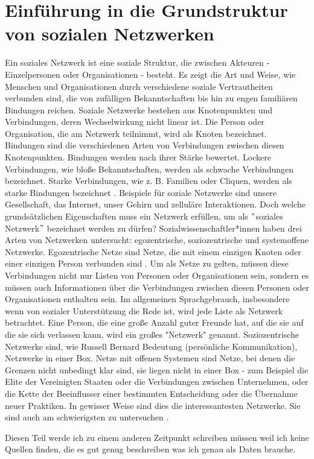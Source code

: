 \section{Einführung in die Grundstruktur von sozialen Netzwerken}
Ein soziales Netzwerk ist eine soziale Struktur, die zwischen Akteuren - Einzelpersonen oder Organisationen - besteht. Es zeigt die Art und Weise, wie Menschen und Organisationen durch verschiedene soziale Vertrautheiten verbunden sind, die von zufälligen Bekanntschaften bis hin zu engen familiären Bindungen reichen. Soziale Netzwerke bestehen aus Knotenpunkten und Verbindungen, deren Wechselwirkung nicht linear ist. Die Person oder Organisation, die am Netzwerk teilnimmt, wird als Knoten bezeichnet. Bindungen sind die verschiedenen Arten von Verbindungen zwischen diesen Knotenpunkten. Bindungen werden nach ihrer Stärke bewertet. Lockere Verbindungen, wie bloße Bekanntschaften, werden als schwache Verbindungen bezeichnet. Starke Verbindungen, wie z. B. Familien oder Cliquen, werden als starke Bindungen bezeichnet \cite{SNADefinition}. Beispiele für soziale Netzwerke sind unsere Gesellschaft, das Internet, unser Gehirn und zelluläre Interaktionen.
Doch welche grundsätzlichen Eigenschaften muss ein Netzwerk erfüllen, um als $"$soziales Netzwerk$"$ bezeichnet werden zu dürfen? 
Sozialwissenschaftler*innen haben drei Arten von Netzwerken untersucht: egozentrische, soziozentrische und systemoffene
Netzwerke. Egozentrische Netze sind Netze, die mit einem einzigen Knoten oder einer einzigen Person verbunden sind \cite{egocentric}. Um als Netze zu gelten, müssen diese Verbindungen nicht nur Listen von Personen oder Organisationen sein, sondern es müssen auch Informationen über die Verbindungen zwischen diesen Personen oder Organisationen enthalten sein. Im allgemeinen Sprachgebrauch, insbesondere wenn von sozialer Unterstützung die Rede ist, wird jede Liste als Netzwerk betrachtet. Eine Person, die eine große Anzahl guter Freunde hat, auf die sie auf die sie sich verlassen kann, wird ein großes "Netzwerk" genannt. Soziozentrische Netzwerke sind, wie Russell Bernard Bedeutung (persönliche Kommunikation), Netzwerke in einer Box. Netze mit offenen Systemen sind Netze, bei denen die Grenzen nicht unbedingt klar sind, sie liegen nicht in einer Box - zum Beispiel die Elite der Vereinigten Staaten oder die Verbindungen zwischen Unternehmen, oder die Kette der Beeinflusser einer bestimmten Entscheidung oder die Übernahme neuer Praktiken. In gewisser Weise sind dies die interessantesten Netzwerke. Sie sind auch am schwierigsten zu untersuchen \cite{charlesKadushin}. 

Diesen Teil werde ich zu einem anderen Zeitpunkt schreiben müssen weil ich keine Quellen finden, die es gut genug beschreiben was ich genau als Daten brauche.




